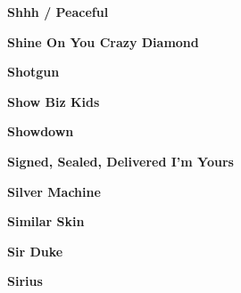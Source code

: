 \vspace{10pt} 
\begin{center}\textbf{Shhh / Peaceful}\end{center}
\newline
\vspace{10pt} 
\begin{center}\textbf{Shine On You Crazy Diamond}\end{center}
\newline
\vspace{10pt} 
\begin{center}\textbf{Shotgun}\end{center}
\newline
\vspace{10pt} 
\begin{center}\textbf{Show Biz Kids}\end{center}
\newline
\vspace{10pt} 
\begin{center}\textbf{Showdown}\end{center}
\newline
\vspace{10pt} 
\begin{center}\textbf{Signed, Sealed, Delivered I'm Yours}\end{center}
\newline
\vspace{10pt} 
\begin{center}\textbf{Silver Machine}\end{center}
\newline
\vspace{10pt} 
\begin{center}\textbf{Similar Skin}\end{center}
\newline
\vspace{10pt} 
\begin{center}\textbf{Sir Duke}\end{center}
\newline
\vspace{10pt} 
\begin{center}\textbf{Sirius}\end{center}
